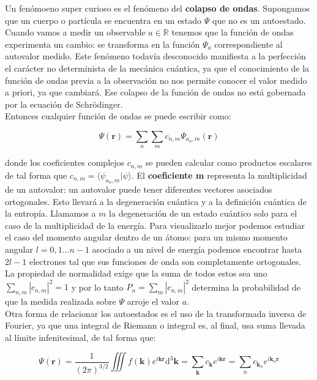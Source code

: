 \documentclass[12pt]{article}
\newcommand{\D}{\mathrm{d}}
\newcommand{\tint}{\iiint}
\newcommand{\rn}{\mathbf{r}}
\newcommand{\kn}{\mathbf{k}}
\begin{document}
Un fenómoeno super curioso es el fenómeno del \textbf{colapso de ondas}. Supongamos que un cuerpo o partícula se encuentra en un estado $\Psi$ que no es un autoestado. Cuando vamos a medir un observable $a \in \mathbb{R}$ tenemos que la función de ondas experimenta un cambio: se transforma en la función $\Psi_a$ correspondiente al autovalor medido. Este fenómeno todavía desconocido manifiesta a la perfección el carácter no determinista de la mecánica cuántica, ya que el conocimiento de la función de ondas previa a la observación no nos permite conocer el valor medido a priori, ya que cambiará. Ese colapso de la función de ondas no está gobernada por la ecuación de Schrödinger. \\

Entonces cualquier función de ondas se puede escribir como:

\begin{equation}
\Psi ( \rn ) = \sum_n \sum_m c_{n,m} \Psi_{a_n,m} ( \rn )
\end{equation}

donde los coeficientes complejos $c_{n,m}$ se pueden calcular como productos escalares de tal forma que $c_{n,m} = \langle \psi_{a_n,m} | \psi \rangle$. El \textbf{coeficiente m} representa la multiplicidad de un autovalor: un autovalor puede tener diferentes vectores asociados ortogonales. Esto llevará a la degeneración cuántica y a la definición cuántica de la entropía. Llamamos a $m$ la degeneración de un estado cuántico solo para el caso de la multiplicidad de la energía. Para visualizarlo mejor podemos estudiar el caso del momento angular dentro de un átomo: para un mismo momento angular $l=0,1...n-1$ asociado a un nivel de energía podemos encontrar hasta $2l-1$ electrones tal que sus funciones de onda son completamente ortogonales. \\

La propiedad de normalidad exige que la suma de todos estos sea uno $\sum_{n,m} |c_{n,m}|^2 = 1$  y por lo tanto $P_n = \sum_m |c_{n,m}|^2$ determina la probabilidad de que la medida realizada sobre $\Psi$ arroje el valor $a$.\\

Otra forma de relacionar los autoestados es el uso de la transformada inversa de Fourier, ya que una integral de Riemann o integral es, al final, usa suma llevada al límite infenitesimal, de tal forma que:

\begin{equation}
\Psi (\rn) = \dfrac{1}{(2\pi)^{3/2}} \tint f(\kn) e^{i \kn \rn} \D ^3 \kn = \sum_{\kn} c_\kn e^{i \kn \rn}  = \sum_{n} c_{\kn_n} e^{i \kn_n \rn }
\end{equation}
\end{document}
